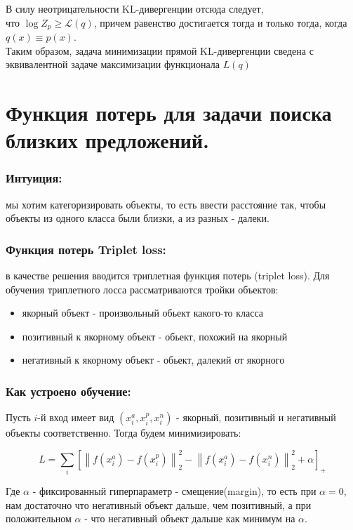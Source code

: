 В силу неотрицательности KL-дивергенции отсюда следует,\\ что $\log Z_p \geq \mathcal{L}(q)$, причем равенство
достигается тогда и только тогда, когда $q(x) \equiv p(x)$. \\ 
Таким образом, задача минимизации прямой KL-дивергенции сведена с эквивалентной задаче максимизации функционала $L(q)$


\section*{Функция потерь для задачи поиска близких предложений.}

\subsubsection*{Интуиция:}
мы хотим категоризировать объекты, то есть ввести расстояние так, чтобы объекты из одного класса были близки, а из разных - далеки.

\subsubsection*{Функция потерь Triplet loss:}
в качестве решения вводится триплетная функция потерь (triplet loss).
Для обучения триплетного лосса рассматриваются тройки объектов:

\begin{itemize}
    \item якорный объект - произвольный обьект какого-то класса 
    \item позитивный к якорному объект - обьект, похожий на якорный
    \item негативный к якорному объект - обьект, далекий от якорного
\end{itemize}

\subsubsection*{Как устроено обучение:}

Пусть $i$-й вход имеет вид $(x_i^a, x_i^p, x_i^n)$ - якорный, позитивный и негативный объекты соответственно. Тогда будем минимизировать:

$$L = \sum\limits_i \left[\left \lVert f(x_i^a) - f(x_i^p) \right \rVert_2^2 - \left \lVert f(x_i^a) - f(x_i^n) \right \rVert_2^2 + \alpha \right]_+$$

Где $\alpha$ - фиксированный гиперпараметр - смещение(margin), то есть при $\alpha = 0$, нам достаточно что негативный объект дальше, чем позитивный, 
а при положительном $\alpha$ - что негативный объект дальше как минимум на $\alpha$.

